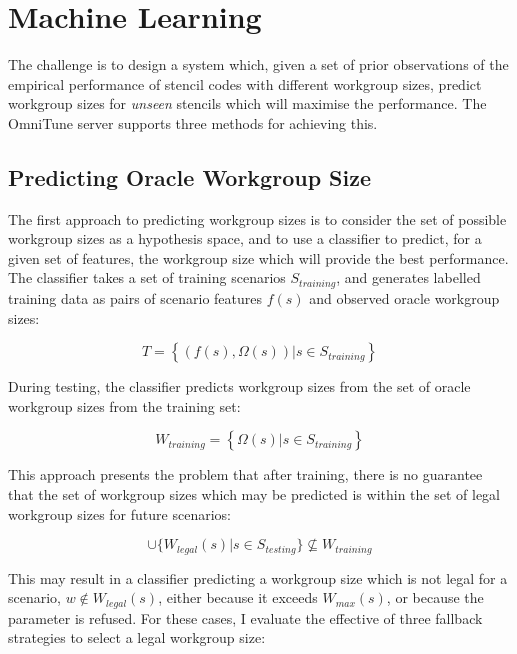 \section{Machine Learning}

The challenge is to design a system which, given a set of prior
observations of the empirical performance of stencil codes with
different workgroup sizes, predict workgroup sizes for \emph{unseen}
stencils which will maximise the performance. The OmniTune server
supports three methods for achieving this.


\subsection{Predicting Oracle Workgroup Size}

The first approach to predicting workgroup sizes is to consider the
set of possible workgroup sizes as a hypothesis space, and to use a
classifier to predict, for a given set of features, the workgroup size
which will provide the best performance. The classifier takes a set of
training scenarios $S_{training}$, and generates labelled training
data as pairs of scenario features $f(s)$ and observed oracle
workgroup sizes:

\begin{equation}
  T = \left\{ \left(f(s), \Omega(s)\right) | s \in S_{training} \right\}
\end{equation}

During testing, the classifier predicts workgroup sizes from the set
of oracle workgroup sizes from the training set:

\begin{equation}
  W_{training} = \left\{ \Omega(s) | s \in S_{training} \right\}
\end{equation}

This approach presents the problem that after training, there is no
guarantee that the set of workgroup sizes which may be predicted is
within the set of legal workgroup sizes for future scenarios:

\begin{equation}
  \cup \{ W_{legal}(s) | s \in S_{testing} \} \nsubseteq W_{training}
\end{equation}

This may result in a classifier predicting a workgroup size which is
not legal for a scenario, $w \not\in W_{legal}(s)$, either because it
exceeds $W_{max}(s)$, or because the parameter is refused. For these
cases, I evaluate the effective of three fallback strategies to select
a legal workgroup size:

